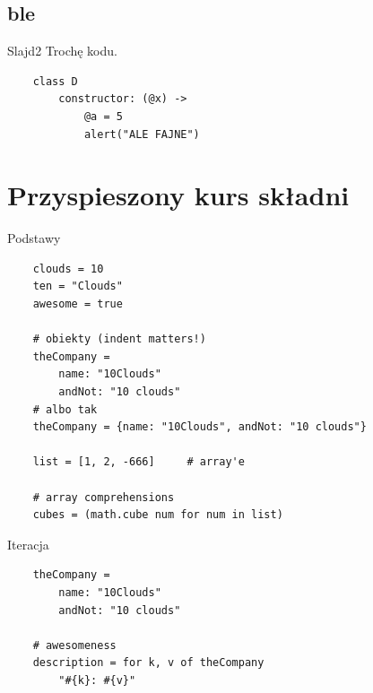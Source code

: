 \documentclass[xcolor=dvipsnames]{beamer}
\begin{document}
\subsection{ble}

\begin{frame}[fragile]{Slajd2}
    Trochę kodu.

    \begin{verbatim}
    class D
        constructor: (@x) ->
            @a = 5
            alert("ALE FAJNE")
    \end{verbatim}
\end{frame}

\section{Przyspieszony kurs składni}

\begin{frame}[fragile]{Podstawy}
    
    \begin{verbatim}
    clouds = 10
    ten = "Clouds"
    awesome = true

    # obiekty (indent matters!)
    theCompany =
        name: "10Clouds"
        andNot: "10 clouds"
    # albo tak
    theCompany = {name: "10Clouds", andNot: "10 clouds"}

    list = [1, 2, -666]     # array'e

    # array comprehensions
    cubes = (math.cube num for num in list)

    \end{verbatim}
\end{frame}

\begin{frame}[fragile]{Iteracja}
    
    \begin{verbatim}
    theCompany =
        name: "10Clouds"
        andNot: "10 clouds"

    # awesomeness
    description = for k, v of theCompany
        "#{k}: #{v}"

    \end{verbatim}
\end{frame}
\end{document}
